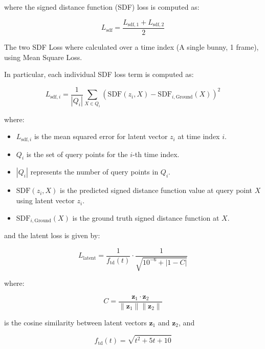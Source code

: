 \documentclass[a4paper,12pt]{article}
\begin{document}
where the signed distance function (SDF) loss is computed as:

\begin{equation}
	L_{\text{sdf}} = \frac{L_{\text{sdf},1} + L_{\text{sdf},2}}{2}
\end{equation}

The two SDF Loss where calculated over a time index (A single bunny, 1 frame), using Mean Square Loss.

In particular, each individual SDF loss term is computed as:

\begin{equation}
	L_{\text{sdf}, i} = \frac{1}{|Q_i|} \sum_{X \in Q_i} \left( \text{SDF}(z_i, X) - \text{SDF}_{i, \text{Ground}}(X) \right)^2
\end{equation}

where:
\begin{itemize}
	\item \( L_{\text{sdf}, i} \) is the mean squared error for latent vector \( z_i \) at time index \( i \).
	\item \( Q_i \) is the set of query points for the \( i \)-th time index.
	\item \( |Q_i| \) represents the number of query points in \( Q_i \).
	\item \( \text{SDF}(z_i, X) \) is the predicted signed distance function value at query point \( X \) using latent vector \( z_i \).
	\item \( \text{SDF}_{i, \text{Ground}}(X) \) is the ground truth signed distance function at \( X \).
\end{itemize}

and the latent loss is given by:

\begin{equation}
	L_{\text{latent}} = \frac{1}{f_{\text{td}}(t)} \cdot \frac{1}{\sqrt{10^{-6} + |1 - C|}}
\end{equation}

where:

\begin{equation}
	C = \frac{\mathbf{z}_1 \cdot \mathbf{z}_2}{\|\mathbf{z}_1\| \|\mathbf{z}_2\|}
\end{equation}

is the cosine similarity between latent vectors \( \mathbf{z}_1 \) and \( \mathbf{z}_2 \), and

\begin{equation}
	f_{\text{td}}(t) = \sqrt{t^2 + 5t + 10}
\end{equation}
\end{document}
